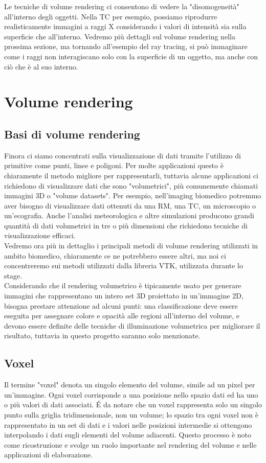 Le tecniche di volume rendering ci consentono di vedere la "disomogeneità" all'interno degli oggetti. Nella TC per esempio, possiamo riprodurre realisticamente immagini a raggi X considerando i valori di intensità sia sulla superficie che all'interno. Vedremo più dettagli sul volume rendering nella prossima sezione, ma tornando all'esempio del ray tracing, si può immaginare come i raggi non interagiscano solo con la superficie di un oggetto, ma anche con ciò che è al suo interno.

\section{Volume rendering}
\subsection{Basi di volume rendering}\label{sec:volume-rendering-details}
Finora ci siamo concentrati sulla visualizzazione di dati tramite l'utilizzo di primitive come punti, linee e poligoni. Per molte applicazioni questo è chiaramente il metodo migliore per rappresentarli, tuttavia alcune applicazioni ci richiedono di visualizzare dati che sono "volumetrici", più comunemente chiamati immagini 3D o "volume datasets". Per esempio, nell'imaging biomedico potremmo aver bisogno di visualizzare dati ottenuti da una RM, una TC, un microscopio o un'ecografia. Anche l'analisi meteorologica e altre simulazioni producono grandi quantità di dati volumetrici in tre o più dimensioni che richiedono tecniche di visualizzazione efficaci.
\\
Vedremo ora più in dettaglio i principali metodi di volume rendering utilizzati in ambito biomedico, chiaramente ce ne potrebbero essere altri, ma noi ci concentreremo sui metodi utilizzati dalla libreria VTK, utilizzata durante lo stage.
\\
Considerando che il rendering volumetrico è tipicamente usato per generare immagini che rappresentano un intero set 3D proiettato in un'immagine 2D, bisogna prestare attenzione ad alcuni punti: una classificazione deve essere eseguita per assegnare colore e opacità alle regioni all'interno del volume, e devono essere definite delle tecniche di illuminazione volumetrica per migliorare il risultato, tuttavia in questo progetto saranno solo menzionate.

\subsection{Voxel}
Il termine "voxel" denota un singolo elemento del volume, simile ad un pixel per un'immagine. Ogni voxel corrisponde a una posizione nello spazio dati ed ha uno o più valori di dati associati. \'E da notare che un voxel rappresenta solo un singolo punto sulla griglia tridimensionale, non un volume; lo spazio tra ogni voxel non è rappresentato in un set di dati e i valori nelle posizioni intermedie si ottengono interpolando i dati sugli elementi del volume adiacenti. Questo processo è noto come ricostruzione e svolge un ruolo importante nel rendering del volume e nelle applicazioni di elaborazione.

